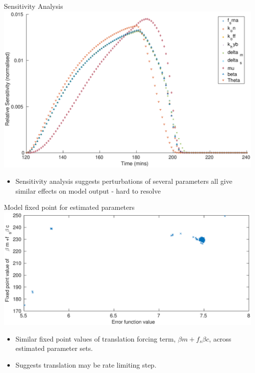 \documentclass{beamer}
\begin{document}
\begin{frame}{Sensitivity Analysis}
  \includegraphics[scale = 0.22, clip = true, trim = 00 0 0 0]{../Figures/Sensitivty_scaled_other}
          \begin{itemize}
    \item Sensitivity analysis suggests perturbations of several parameters all give similar effects on model output - \alert{hard to resolve}
            \end{itemize}
\end{frame}

\begin{frame}{Model fixed point for estimated parameters}
  \includegraphics[scale = 0.24, clip = true, trim = 0 0 0 0]{../Figures/fixedpoint_f}
\begin{itemize}
	\item Similar fixed point values of translation forcing term, ${\beta} m +{f_{s}}\beta c$, across estimated parameter sets.
	\item Suggests translation may be rate limiting step.
\end{itemize}
\end{frame}
\end{document}
